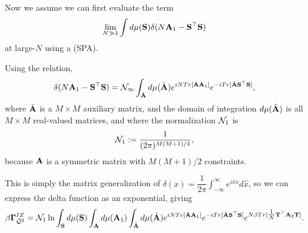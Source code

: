 Now we assume we can first evaluate the term 
\begin{align}
  \lim_{N\gg 1} \int d\mu(\mathbf{S})    \delta(N\mathbf{A}_{1}-\mathbf{S}^{\top}\mathbf{S})
\end{align}
at large-$N$ using a \SaddlePointApproximation (SPA).


Using the relation, 
\begin{align}
\delta(N\mathbf{A}_{1}-{\mathbf{S}}^{\top}{\mathbf{S}})
   =\mathcal{N_1}\int_{\hat{\mathbf{A}}}  d\mu(\hat{\mathbf{A}}) e^{ iN Tr[\hat{\mathbf{A}}\mathbf{A}_{1}] } e^{ -i Tr[\hat{\mathbf{A}}{\mathbf{S}}^{\top}{\mathbf{S}}] }  ,
\end{align}
where $\hat{\mathbf{A}}$ is a  $M \times M$ auxiliary matrix, and the domain of integration $d\mu(\hat{\mathbf{A}})$ is all $M \times M$ real-valued matrices, and where the normalization $\mathcal{N}_{1}$ is
\begin{align}
  \label{eqn:norm_1}
\mathcal{N}_1:=\frac{1}{(2\pi)^{M(M+1)/4}},
\end{align}
because  $\mathbf{A}$ is a symmetric matrix with $M(M+1)/2$ constraints.

This is simply the matrix generalization of 
$\delta(x)=\dfrac{1}{2\pi}\int_{-\infty}^{\infty} e^{i\hat{x}x}d\hat{x}$,
so we can express the delta function as an exponential, giving
\begin{align}
\label{eqn:Q2}
\beta\mathbf{\Gamma}^{IZ}_{\bar{\mathcal{Q}}^{2}} = \mathcal{N}_1 \ln\int_{{\mathbf{S}}}  d\mu(\mathbf{S}) \int_{\mathbf{A}} d\mu(\mathbf{A}_{1}) 
                           \int_{\hat{\mathbf{A}}} d\mu(\hat{\mathbf{A}}) e^{ iN Tr[ \hat{\mathbf{A}}\mathbf{A}_{1} ] }
                           e^{ -i Tr[ \hat{\mathbf{A}}\mathbf{S}^{\top} \mathbf{S} ] }
                           e^{  N\beta Tr[\tfrac{1}{N} {\mathbf{T}}^{\top}\mathbf{A}_{2}{\mathbf{T}} ] } .
\end{align}

